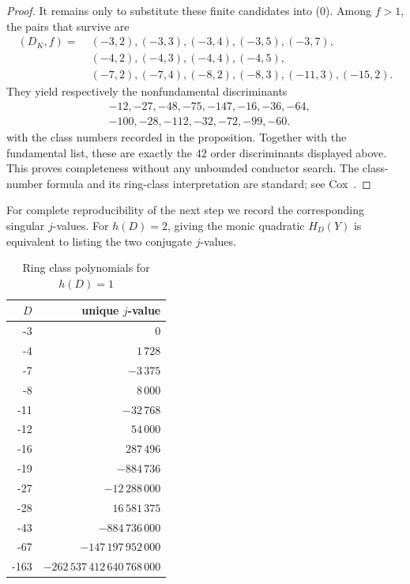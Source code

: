 \documentclass[11pt,a4paper]{amsart} %
\theoremstyle{definition}
\begin{document}
\begin{proof}
It remains only to substitute these finite candidates into (0). Among
\(f>1\), the pairs that survive are
\[
\begin{aligned}
(D_K,f)=\;&(-3,2),(-3,3),(-3,4),(-3,5),(-3,7),\\
&(-4,2),(-4,3),(-4,4),(-4,5),\\
&(-7,2),(-7,4),(-8,2),(-8,3),(-11,3),(-15,2).
\end{aligned}
\]
They yield respectively the nonfundamental discriminants
\[
\begin{aligned}
&-12,-27,-48,-75,-147,-16,-36,-64,\\
&-100,-28,-112,-32,-72,-99,-60.
\end{aligned}
\]
with the class numbers recorded in the proposition. Together with the
fundamental list, these are exactly the \(42\) order discriminants displayed
above. This proves completeness without any unbounded conductor search. The
class-number formula and its ring-class interpretation are standard; see
Cox~\cite[Chs.~7,11]{Cox}.
\end{proof}

For complete reproducibility of the next step we record the corresponding
singular \(j\)-values. For \(h(D)=2\), giving the monic quadratic
\(H_D(Y)\) is equivalent to listing the two conjugate \(j\)-values.

\begin{table}[htbp]
\centering
\caption{Ring class polynomials for \(h(D)=1\)}\label{tab:h1j}
\small
\begin{tabular}{@{}r r@{}}
\toprule
\(D\)& unique \(j\)-value\\
\midrule
-3 & \(0\) \\
-4 & \(1\,728\) \\
-7 & \(-3\,375\) \\
-8 & \(8\,000\) \\
-11 & \(-32\,768\) \\
-12 & \(54\,000\) \\
-16 & \(287\,496\) \\
-19 & \(-884\,736\) \\
-27 & \(-12\,288\,000\) \\
-28 & \(16\,581\,375\) \\
-43 & \(-884\,736\,000\) \\
-67 & \(-147\,197\,952\,000\) \\
-163 & \(-262\,537\,412\,640\,768\,000\) \\
\bottomrule
\end{tabular}
\end{table}
\end{document}
